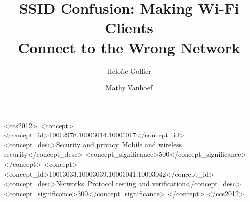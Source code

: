 \documentclass[sigconf,review,anonymous]{acmart}
\newcommand{\wifi}{\mbox{Wi-Fi}}
\begin{document}
\title{SSID Confusion:
Making \wifi{} Clients\\ Connect to the Wrong Network}

\author{Héloïse Gollier}

\author{Mathy Vanhoef}

\renewcommand{\shortauthors}{Mathy Vanhoef, Xianjun Jiao, Wei Liu \& Ingrid Moerman}

\begin{CCSXML}
<ccs2012>
   <concept>
       <concept_id>10002978.10003014.10003017</concept_id>
       <concept_desc>Security and privacy~Mobile and wireless security</concept_desc>
       <concept_significance>500</concept_significance>
       </concept>
   <concept>
       <concept_id>10003033.10003039.10003041.10003042</concept_id>
       <concept_desc>Networks~Protocol testing and verification</concept_desc>
       <concept_significance>300</concept_significance>
       </concept>
 </ccs2012>
\end{CCSXML}




\end{document}
